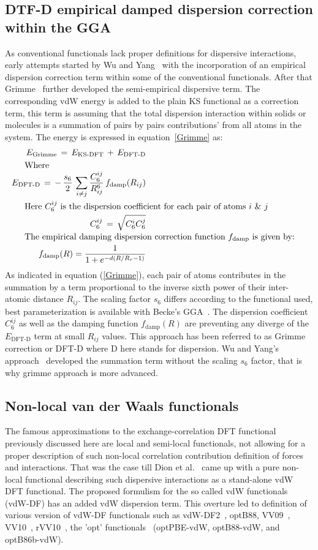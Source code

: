 \subsection{DTF-D empirical damped dispersion correction within the GGA}
As conventional functionals lack proper definitions for dispersive interactions, early attempts started by Wu and Yang~\cite{Wu2002} with the incorporation of an empirical dispersion correction term within some of the conventional functionals. After that Grimme~\cite{Grimme2004, Grimme2006} further developed the semi-empirical dispersive term. The corresponding vdW energy is added to the plain KS functional as a correction term, this term is assuming that the total dispersion interaction within solids or molecules is a summation of pairs by pairs contributions' from all atoms in the system. The energy is expressed in equation~\ref{Grimme} as:
%
\begin{eqnarray}
E_{\text{Grimme}} \, = \, E_{\text{KS-DFT}} \, + \, E_{\text{DFT-D}} \\
\noalign {{Where}}
E_{\text{DFT-D}} \, = \, - \, {s_6 \over 2} \, \sum_{i \neq j}{{C_6^{ij}} \over {R_{ij}^6}} \, f_{\text{damp}}(R_{ij}) \\
\noalign{Here $C_6^{ij}$ is the dispersion coefficient for each pair of atoms $i$ $\&$ $j$}
C_6^{ij} \, = \, \sqrt{C_6^{i}C_6^{j}} \\
\noalign{The empirical damping dispersion correction function $f_{\text{damp}}$ is given by:}
f_{\text{damp}}(R) = {1 \over {1+e^{-d(R/R_r-1)}}}
\label{Grimme}
\end{eqnarray}
%
As indicated in equation (\ref{Grimme}), each pair of atoms contributes in the summation by a term proportional to the inverse sixth power of their inter-atomic distance $R_{ij}$. The scaling factor $s_6$ differs according to the functional used, best parameterization is available with Becke's GGA~\cite{Becke1997}. The dispersion coefficient $C_6^{ij}$ as well as the damping function $f_{\text{damp}}(R)$ are preventing any diverge of the $E_{\text{DFT-D}}$ term at small $R_{ij}$ values. This approach has been referred to as Grimme correction or DFT-D where D here stands for dispersion. Wu and Yang's approach~\cite{Wu2002} developed the summation term without the scaling $s_6$ factor, that is why grimme approach is more advanced. 
\subsection{Non-local van der Waals functionals}
\label{nonlocalvdW}
The famous approximations to the exchange-correlation DFT functional previously discussed here are local and semi-local functionals, not allowing for a proper description of such non-local correlation contribution definition of forces and interactions. That was the case till Dion et al.~\cite{Dion2004} came up with a pure non-local functional describing such dispersive interactions as a stand-alone vdW DFT functional. The proposed formulism for the so called vdW functionals (vdW-DF) has an added vdW dispersion term. This overture led to definition of various version of vdW-DF functionals such as vdW-DF2~\cite{Lee2010DF2}, optB88, VV09~\cite{Vydrov2009}, VV10~\cite{Oleg2010}, rVV10~\cite{Sabatini2013}, the 'opt' functionals~\cite{vdWDFopt} (optPBE-vdW, optB88-vdW, and optB86b-vdW).
